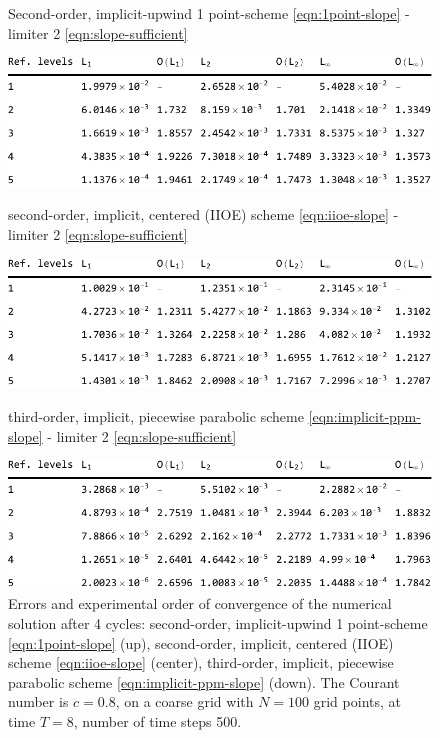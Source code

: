 \documentclass[../thesis.tex]{subfiles}
\begin{document}
\begin{figure}[H]
	\centering
    \caption*{Second-order, implicit-upwind 1 point-scheme \eqref{eqn:1point-slope} - limiter 2 \eqref{eqn:slope-sufficient}}
	\includegraphics[width=\textwidth]{../tab/tab-1point-c0p8-T8-limit2-smooth.pdf}
    \caption*{second-order, implicit, centered (IIOE) scheme \eqref{eqn:iioe-slope} - limiter 2 \eqref{eqn:slope-sufficient}}
	\includegraphics[width=\textwidth]{../tab/tab-iioe-c0p8-T8-limit2-smooth.pdf}
    \caption*{third-order, implicit, piecewise parabolic scheme \eqref{eqn:implicit-ppm-slope} - limiter 2 \eqref{eqn:slope-sufficient}}
	\includegraphics[width=\textwidth]{../tab/tab-implicit-ppm-c0p8-T8-limit2-smooth.pdf}
	\caption{Errors and experimental order of convergence of the numerical solution after 4 cycles: second-order, implicit-upwind 1 point-scheme \eqref{eqn:1point-slope} (up), second-order, implicit, centered (IIOE) scheme \eqref{eqn:iioe-slope} (center), third-order, implicit, piecewise parabolic scheme \eqref{eqn:implicit-ppm-slope} (down). The Courant number is \(c = 0.8\), on a coarse grid with \(N = 100\) grid points, at time \(T = 8\), number of time steps 500.}
	\label{tab:c0p8-T8-limit2-smooth}
\end{figure}
\end{document}
